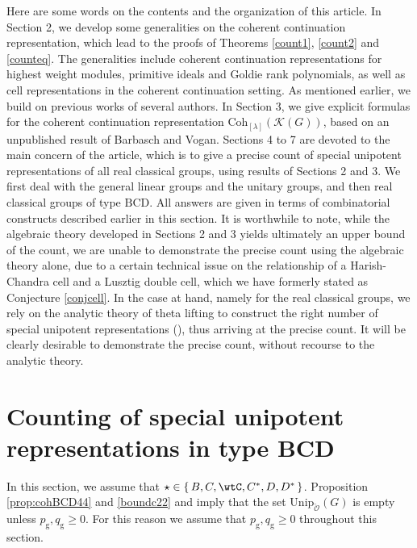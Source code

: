 \documentclass[12pt,a4paper]{amsart}
\newcommand{\CK}{{\mathcal {K}}}
\newcommand{\CO}{{\mathcal {O}}}
\numberwithin{equation}{section}
\theoremstyle{remark}
\newtheorem{remark}[thm]{Remark}
\def\Unip{\mathrm{Unip}}
\def\Coh{\mathrm{Coh}}
\newcommand{\Lam}{{[\lambda]}}
\begin{document}
Here are some words on the contents and the organization of this article. In Section 2, we develop some generalities on the coherent continuation representation, which lead to the proofs of Theorems \ref{count1}, \ref{count2} and \ref{counteq}. The generalities include coherent continuation representations for highest weight modules, primitive ideals and Goldie rank polynomials, as well as cell representations in the coherent continuation setting. As mentioned earlier, we build on previous works of several authors.
In Section 3, we give explicit formulas for the coherent continuation representation $\Coh_{\Lam}(\CK(G))$, based on an unpublished result of Barbasch and Vogan. Sections 4 to 7 are devoted to the main concern of the article, which is to give a precise count of special unipotent representations of all real classical groups, using results of Sections 2 and 3. We first deal with the general linear groups and the unitary groups, and then real classical groups of type $\mathrm{BCD}$. All answers are given in terms of combinatorial constructs described earlier in this section. It is worthwhile to note, while the algebraic theory developed in Sections 2 and 3 yields ultimately an upper bound of the count, we are unable to demonstrate the precise count using the algebraic theory alone, due to a certain technical issue on the relationship of a Harish-Chandra cell and a Lusztig double cell, which we have formerly stated as Conjecture \ref{conjcell}. In the case at hand, namely for the real classical groups, we rely on the analytic theory of theta lifting to construct the right number of special unipotent representations (\cite{BMSZ2}), thus arriving at the precise count. It will be clearly desirable to demonstrate the precise count, without recourse to the analytic theory.




\section{Counting of special unipotent representations in type BCD}



In this section, we assume that $\star \in \set{B,C,\wtC,C^{*},D,D^{*}}$. Proposition \ref{prop:cohBCD44} and \eqref{boundc22} and  imply that the set $\Unip_{\check \CO}(G)$ is empty unless
 $p_\mathrm g, q_\mathrm g\geq 0$. For this reason we assume that  $p_\mathrm g, q_\mathrm g\geq 0$ throughout this section. 
 
\end{document}

